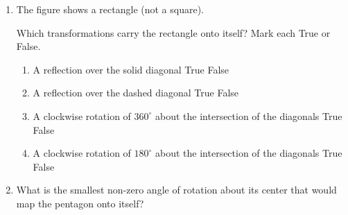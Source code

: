 \documentclass[12pt, twoside]{article}
\begin{document}
\begin{enumerate}
 \item The figure shows a rectangle (not a square).
  \begin{center}
  \end{center}
  Which transformations carry the rectangle onto itself? Mark each True or False.
    \begin{enumerate}
      \item A reflection over the solid diagonal \hfill True \quad False
      \item A reflection over the dashed diagonal \hfill True \quad False
      \item A clockwise rotation of $360^\circ$ about the intersection of the diagonals \hfill True \quad False
      \item A clockwise rotation of $180^\circ$ about the intersection of the diagonals \hfill True \quad False
    \end{enumerate}
    \vspace{1cm}

  \item What is the smallest non-zero angle of rotation about its center that would map the pentagon onto itself? \vspace{0.25cm} %
  \begin{center}
   \end{center}

\end{enumerate}
\end{document}
